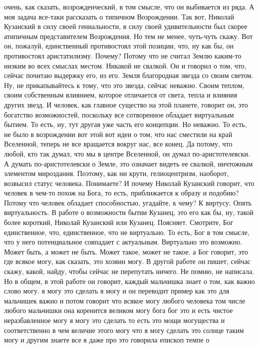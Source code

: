 очень, как сказать, возрожденческий, в том смысле, что он выбивается из ряда. А
моя задача все-таки рассказать о типичном Возрождении. Так вот, Николай
Кузанский в силу своей гениальности, в силу своей удивительности был скорее
атипичным представителем Возрождения. Но тем не менее, чуть-чуть скажу. Вот он,
пожалуй, единственный противостоял этой позиции, что, ну как бы, он противостоял
аристатилизму. Почему? Потому что не считал Землю каким-то низким во всех
смыслах местом. Никакой не свалкой. Он и говорил о том, что, сейчас почитаю
выдержку его, из его. Земля благородная звезда со своим светом. Ну, не
прикапывайтесь к тому, что это звезда, сейчас неважно. Своим теплом, своим
собственным влиянием, которое отличается от света, тепла и влияния других звезд.
И человек, как главное существо на этой планете, говорит он, это богатство
возможностей, поскольку все сотворенное обладает виртуальным бытием. То есть,
ну, тут другая уже часть его концепции. Но неважно. То есть, не было в
возрождении вот этой вот идеи о том, что нас сместили на край Вселенной, теперь
не все вращается вокруг нас, все конец. Да потому, что любой, кто так думал, что
мы в центре Вселенной, он думал по-аристотелевски. А думать по-аристотелевски о
Земле, это означает видеть ее свалкой, ничтожным элементом мироздания. Поэтому,
как ни крути, гелиоцентризм, наоборот, возвысил статус человека. Понимаете? И
почему Николай Кузанский говорит, что человек в чем-то похож на Бога, то есть,
приближается к образу и подобию? Потому что человек обладает способностью,
угадайте, к чему? К виртусу. Опять виртуальность. В работе о возможности бытии
Кузанец, это его как бы, ну, такой более короткий, Николай Кузанский или
Кузанец. Поясняет. Смотрите, Бог единственное, что, единственное, что не
виртуально. То есть, Бог в том смысле, что у него потенциальное совпадает с
актуальным. Виртуально это возможно. Может быть, а может не быть. Может такое,
может не такое. а Бог говорит, это где всякое могу, как сказать, это хозяин
могу. В другой работе он пишет, сейчас скажу, какой, найду, чтобы сейчас не
перепутать ничего. Не помню, не написала. Но в общем, в этой работе он говорит,
каждый мальчишка знает о том, как важно слово могу. я могу это сделать я могу и
он переводит пример как это для мальчишек важно и потом говорит что всякое могу
любого человека том числе любого мальчишки она коренится великом могу бога бог
это и есть чистое неразбавленное могу я могу это сделать то есть это мощи
могущества и соответственно в чем величие этого могу что я могу сделать это
солнце таким могу и другим знаете все я даже про это говорила епископ темпе о
